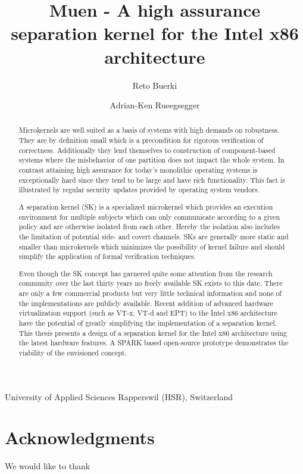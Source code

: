 \documentclass[a4paper,twoside]{report}
\title{Muen - A high assurance separation kernel for the Intel x86 architecture}
\author{Reto Buerki \and Adrian-Ken Rueegsegger}
\begin{document}


\maketitle

University of Applied Sciences Rapperswil (HSR), Switzerland

\begin{abstract}
Microkernels are well suited as a basis of systems with high demands on
robustness. They are by definition small which is a precondition for rigorous
verification of correctness. Additionally they lend themselves to construction
of component-based systems where the misbehavior of one partition does not
impact the whole system. In contrast attaining high assurance for today’s
monolithic operating systems is exceptionally hard since they tend to be large
and have rich functionality. This fact is illustrated by regular security
updates provided by operating system vendors.

A separation kernel (SK) is a specialized microkernel which provides an
execution environment for multiple subjects which can only communicate according
to a given policy and are otherwise isolated from each other. Hereby the
isolation also includes the limitation of potential side- and covert channels.
SKs are generally more static and smaller than microkernels which minimizes the
possibility of kernel failure and should simplify the application of formal
verification techniques.

Even though the SK concept has garnered quite some attention from the research
community over the last thirty years no freely available SK exists to this date.
There are only a few commercial products but very little technical information
and none of the implementations are publicly available. Recent addition of
advanced hardware virtualization support (such as VT-x, VT-d and EPT) to the
Intel x86 architecture have the potential of greatly simplifying the
implementation of a separation kernel. This thesis presents a design of a
separation kernel for the Intel x86 architecture using the latest hardware
features. A SPARK based open-source prototype demonstrates the viability of the
envisioned concept.
\end{abstract}

\section*{Acknowledgments}
We would like to thank

\tableofcontents
\listoffigures
\lstlistoflistings







\printindex{}



\end{document}
